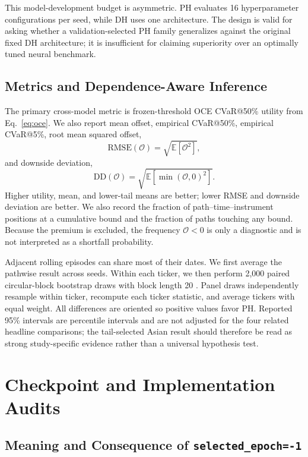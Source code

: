 \documentclass[conference]{IEEEtran}
\newcommand{\Offset}{\mathcal{O}}
\begin{document}
This model-development budget is asymmetric. PH evaluates 16 hyperparameter
configurations per seed, while DH uses one architecture. The design is valid
for asking whether a validation-selected PH family generalizes against the
original fixed DH architecture; it is insufficient for claiming superiority
over an optimally tuned neural benchmark.

\subsection{Metrics and Dependence-Aware Inference}

The primary cross-model metric is frozen-threshold OCE CVaR@50\% utility from
Eq.~\eqref{eq:oce}. We also report mean offset, empirical CVaR@50\%, empirical
CVaR@5\%, root mean squared offset,
\begin{equation}
\mathrm{RMSE}(\Offset)=\sqrt{\mathbb E[\Offset^2]},
\end{equation}
and downside deviation,
\begin{equation}
\mathrm{DD}(\Offset)=\sqrt{\mathbb E[\min(\Offset,0)^2]}.
\end{equation}
Higher utility, mean, and lower-tail means are better; lower RMSE and downside
deviation are better. We also record the fraction of path--time--instrument
positions at a cumulative bound and the fraction of paths touching any bound.
Because the premium is excluded, the frequency $\Offset<0$ is only a diagnostic
and is not interpreted as a shortfall probability.

Adjacent rolling episodes can share most of their dates. We first average the
pathwise result across seeds. Within each ticker, we then perform 2,000 paired
circular-block bootstrap draws with block length 20 \cite{politis1992}. Panel
draws independently resample within ticker, recompute each ticker statistic,
and average tickers with equal weight. All differences are oriented so positive
values favor PH. Reported 95\% intervals are percentile intervals and are not
adjusted for the four related headline comparisons; the tail-selected Asian
result should therefore be read as strong study-specific evidence rather than
a universal hypothesis test.

\section{Checkpoint and Implementation Audits}
\label{sec:audits}

\subsection{Meaning and Consequence of \texttt{selected\_epoch=-1}}
\end{document}
